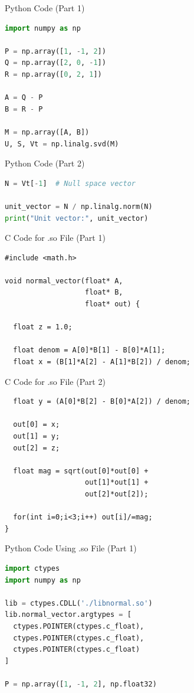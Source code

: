 \documentclass{beamer}
\begin{document}
\begin{frame}[fragile]{Python Code (Part 1)}
\begin{lstlisting}[language=Python]
import numpy as np

P = np.array([1, -1, 2])
Q = np.array([2, 0, -1])
R = np.array([0, 2, 1])

A = Q - P
B = R - P

M = np.array([A, B])
U, S, Vt = np.linalg.svd(M)
\end{lstlisting}
\end{frame}

\begin{frame}[fragile]{Python Code (Part 2)}
\begin{lstlisting}[language=Python]
N = Vt[-1]  # Null space vector

unit_vector = N / np.linalg.norm(N)
print("Unit vector:", unit_vector)
\end{lstlisting}
\end{frame}


\begin{frame}[fragile]{C Code for .so File (Part 1)}
\begin{lstlisting}
#include <math.h>

void normal_vector(float* A,
                   float* B,
                   float* out) {

  float z = 1.0;

  float denom = A[0]*B[1] - B[0]*A[1];
  float x = (B[1]*A[2] - A[1]*B[2]) / denom;
\end{lstlisting}
\end{frame}

\begin{frame}[fragile]{C Code for .so File (Part 2)}
\begin{lstlisting}
  float y = (A[0]*B[2] - B[0]*A[2]) / denom;

  out[0] = x;
  out[1] = y;
  out[2] = z;

  float mag = sqrt(out[0]*out[0] +
                   out[1]*out[1] +
                   out[2]*out[2]);

  for(int i=0;i<3;i++) out[i]/=mag;
}
\end{lstlisting}
\end{frame}





\begin{frame}[fragile]{Python Code Using .so File (Part 1)}
\begin{lstlisting}[language=Python]
import ctypes
import numpy as np

lib = ctypes.CDLL('./libnormal.so')
lib.normal_vector.argtypes = [
  ctypes.POINTER(ctypes.c_float),
  ctypes.POINTER(ctypes.c_float),
  ctypes.POINTER(ctypes.c_float)
]

P = np.array([1, -1, 2], np.float32)
\end{lstlisting}
\end{frame}
\end{document}
